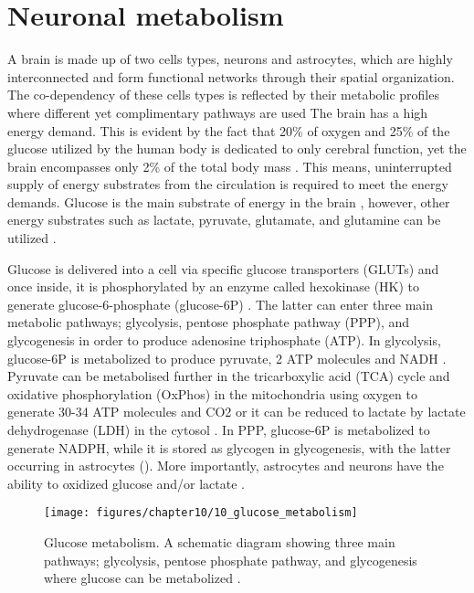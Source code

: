 \section{Neuronal metabolism}
A brain is made up of two cells types, neurons and astrocytes, which are highly interconnected and form functional networks through their spatial organization. The co-dependency of these cells types is reflected by their metabolic profiles where different yet complimentary pathways are used \citep{Belanger2011,Schonfeld2013} The brain has a high energy demand. This is evident by the fact that 20\% of oxygen and 25\% of the glucose utilized by the human body is dedicated to only cerebral function, yet the brain encompasses only 2\% of the total body mass \citep{Belanger2011}. This means, uninterrupted supply of energy substrates from the circulation is required to meet the energy demands. Glucose is the main substrate of energy in the brain 
\citep{Dienel2012,Pellerin2012} , however, other energy substrates such as lactate, pyruvate, glutamate, and glutamine can be utilized \citep{Zielke2009}.

Glucose is delivered into a cell via specific glucose transporters (GLUTs) and once inside, it is phosphorylated by an enzyme called hexokinase (HK) to generate glucose-6-phosphate (glucose-6P) \citep{Belanger2011,Herrero-Mendez2009}. The latter can enter three main metabolic pathways; glycolysis, pentose phosphate pathway (PPP), and glycogenesis in order to produce adenosine triphosphate (ATP). In glycolysis, glucose-6P is metabolized to produce pyruvate, 2 ATP molecules and NADH \citep{Belanger2011}. Pyruvate can be metabolised further in the tricarboxylic acid (TCA) cycle and oxidative phosphorylation (OxPhos) in the mitochondria using oxygen to generate 30-34 ATP molecules and CO2 or it can be reduced to lactate by lactate dehydrogenase (LDH) in the cytosol \citep{Belanger2011}. In PPP, glucose-6P is metabolized to generate NADPH, while it is stored as glycogen in glycogenesis, with the latter occurring in astrocytes \citep{Belanger2011} (). More importantly, astrocytes and neurons have the ability to oxidized glucose and/or lactate \citep{Zielke2009}.

\begin{figure}[!htbp]
  \texttt{[image: figures/chapter10/10\_glucose\_metabolism]}
  \caption[Glucose metabolism]{Glucose metabolism. A schematic diagram showing three main pathways; glycolysis, pentose phosphate pathway, and glycogenesis where glucose can be metabolized \citep{Belanger2011} .}
  \label{fig:10_glucose_metabolism}
\end{figure}

